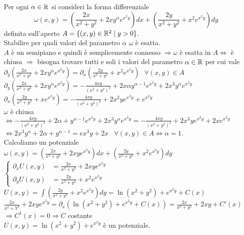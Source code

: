 	
\begin{exbar}
\begin{example}
	Per ogni $\alpha  \in \mathbb{R}$ si consideri la forma differenziale 
	\begin{equation*}
		\omega (x,y)=\left(\frac{2x}{x^2+y^2}+2xy^\alpha e^{x^2y} \right) dx + \left( \frac{2y}{x^2+y^2}+x^2e^{x^2y} \right) dy
	\end{equation*}
	definita sull'aperto $A= \{ (x,y)\in \mathbb{R}^2 \mid y >0\}$. \\
	Stabilire per quali valori del parametro $\alpha$ $\omega$ è esatta.\\
	$A$ è un semipiano e quindi è semplicemente connesso $\Rightarrow \omega$ è esatta in $A \Leftrightarrow $ è chiusa $\Rightarrow$ bisogna trovare tutti e soli i valori del parametro $\alpha \in \mathbb{R}$ per cui vale $\partial_y\left( \frac{2x}{x^2+y^2}+2xy^\alpha e^{x^2y} \right) = \partial_x\left( \frac{2y}{x^2+y^2}+x^2e^{x^2y} \right)\,\,\,\, \forall (x,y)\in A$\\
	$\partial_y\left( \frac{2x}{x^2+y^2} + 2xy^\alpha e^{x^2y} \right)=-\frac{4xy}{(x^2+y^2)^2}+2x\alpha y^{\alpha-1} e^{x^2y}+ 2x^3 y^\alpha e^{x^2y}$\\
	$\partial_x\left( \frac{2y}{x^2+y^2}+xe^{x^2y} \right)=-\frac{4xy}{(x^2+y^2)^2}+2x^2 y e^{x^2 y}+e^{x^2y}$ \\
	$\omega $ è chiusa $\Leftrightarrow -\frac{4xy}{(x^2+y^2)^2}+2\alpha + y^{\alpha-1}e^{x^2y}+2x^3y^\alpha e^{x^2y}= -\frac{4xy}{(x^2+y^2)^2} +2x^3 y e^{x^2y } + 2x e^{x^2y}$\\
	$\Leftrightarrow 2x^3y^\alpha+ 2\alpha + y^{\alpha-1} = ex^3 y+ 2x$\,\,\, $\forall (x,y)\in A \Leftrightarrow \alpha=1$.\\
	Calcoliamo un potenziale\\
	$\omega(x,y)= \left(\frac{2x}{x^2+y^2} +2xy e^{x^2y}\right)dx+ \left( \frac{2y}{x^2+y^2}+x^2e^{x^2y} \right)dy$\\
	$\begin{cases}
		\partial_xU(x,y)&=\frac{2x}{x^2+y^2}+2xy e^{x^2y} \\
		\partial_yU(x,y)&=\frac{2y}{x^2+y^2}+x^2e^{x^2y}
	\end{cases}$\\
	$U(x,y)=\int \left( \frac{2y}{x^2+y^2}+x^2e^{x^2y} \right)dy =\ln(x^2+y^2)+e^{x^2y}+C(x)$\\
	$\frac{2x}{x^2+Y^2}+2xy e^{x^2y}=\partial_x\left( \ln(x^2+y^2) +e^{x^2y}+C(x)\right)=\frac{2x}{x^2+y^2}+2xy + C'(x)$\\
	$\Rightarrow C^1 (x)=0 \Rightarrow  C$ costante\\
	$U(x,y)=\ln (x^2+y^2) + e^{x^2y}$ è un potenziale.
\end{example}
\end{exbar}